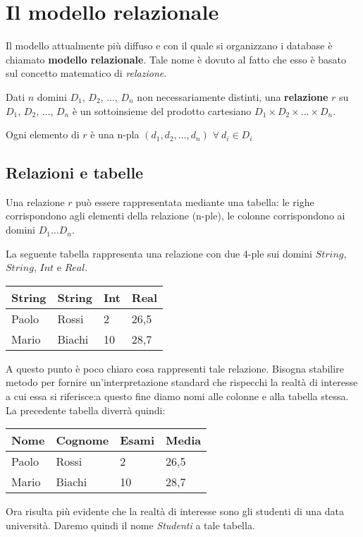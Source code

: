 \section{Il modello relazionale}
Il modello attualmente più diffuso e con il quale si organizzano i database è chiamato
\textbf{modello relazionale}. Tale nome è dovuto al fatto che esso è basato sul
concetto matematico di \emph{relazione}.
\begin{defn}
 Dati $n$ domini $D_1$, $D_2$, $\ldots$, $D_n$ non necessariamente distinti, una 
 \textbf{relazione} $r$ su $D_1$, $D_2$, $\ldots$, $D_n$ è un sottoinsieme del prodotto cartesiano
 $D_1 \times D_2 \times \ldots \times D_n$.
\end{defn}
Ogni elemento di $r$ è una n-pla $(d_1, d_2, \ldots, d_n)$  $\forall \ d_i \in D_i$

\subsection{Relazioni e tabelle}
Una relazione $r$ può essere rappresentata mediante una tabella: le righe corrispondono
agli elementi della relazione (n-ple), le colonne corrispondono ai domini $D_1\ldots D_n$.

\begin{exmp}
La seguente tabella rappresenta una relazione con due 4-ple sui domini $String$, $String$, 
$Int$ e $Real$.
 \begin{center}
  \begin{tabular}{llll}
    String & String & Int & Real\\
    \hline
    Paolo & Rossi & 2 & 26,5\\
    Mario & Biachi & 10 & 28,7
  \end{tabular}
 \end{center}
 A questo punto è poco chiaro cosa rappresenti tale relazione. Bisogna stabilire metodo per
 fornire un'interpretazione standard che rispecchi la realtà di interesse a cui essa si 
 riferisce:a questo fine diamo nomi alle colonne e alla tabella stessa. La precedente tabella
 diverrà quindi:

\begin{center}
  \begin{tabular}{l | l | l | l}
    Nome & Cognome & Esami & Media\\
    \hline
    Paolo & Rossi & 2 & 26,5\\
    Mario & Biachi & 10 & 28,7
  \end{tabular}
 \end{center}
 Ora risulta più evidente che la realtà di interesse sono gli studenti di una data università. 
 Daremo quindi il nome \emph{Studenti} a tale tabella.
\end{exmp}

